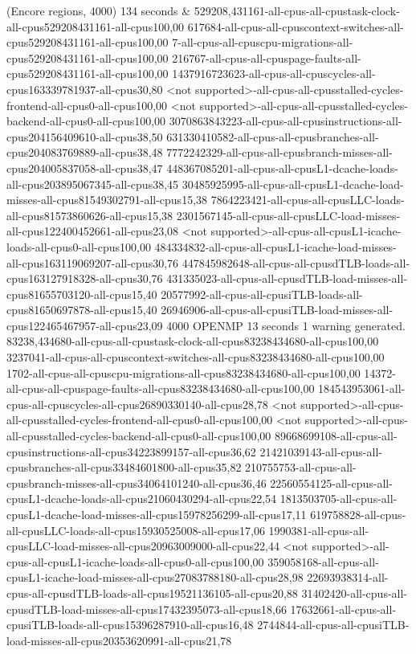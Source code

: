 (Encore regions, 4000) 134 seconds
&
529208,431161-all-cpus-all-cpustask-clock-all-cpus529208431161-all-cpus100,00
617684-all-cpus-all-cpuscontext-switches-all-cpus529208431161-all-cpus100,00
7-all-cpus-all-cpuscpu-migrations-all-cpus529208431161-all-cpus100,00
216767-all-cpus-all-cpuspage-faults-all-cpus529208431161-all-cpus100,00
1437916723623-all-cpus-all-cpuscycles-all-cpus163339781937-all-cpus30,80
<not supported>-all-cpus-all-cpusstalled-cycles-frontend-all-cpus0-all-cpus100,00
<not supported>-all-cpus-all-cpusstalled-cycles-backend-all-cpus0-all-cpus100,00
3070863843223-all-cpus-all-cpusinstructions-all-cpus204156409610-all-cpus38,50
631330410582-all-cpus-all-cpusbranches-all-cpus204083769889-all-cpus38,48
7772242329-all-cpus-all-cpusbranch-misses-all-cpus204005837058-all-cpus38,47
448367085201-all-cpus-all-cpusL1-dcache-loads-all-cpus203895067345-all-cpus38,45
30485925995-all-cpus-all-cpusL1-dcache-load-misses-all-cpus81549302791-all-cpus15,38
7864223421-all-cpus-all-cpusLLC-loads-all-cpus81573860626-all-cpus15,38
2301567145-all-cpus-all-cpusLLC-load-misses-all-cpus122400452661-all-cpus23,08
<not supported>-all-cpus-all-cpusL1-icache-loads-all-cpus0-all-cpus100,00
484334832-all-cpus-all-cpusL1-icache-load-misses-all-cpus163119069207-all-cpus30,76
447845982648-all-cpus-all-cpusdTLB-loads-all-cpus163127918328-all-cpus30,76
431335023-all-cpus-all-cpusdTLB-load-misses-all-cpus81655703120-all-cpus15,40
20577992-all-cpus-all-cpusiTLB-loads-all-cpus81650697878-all-cpus15,40
26946906-all-cpus-all-cpusiTLB-load-misses-all-cpus122465467957-all-cpus23,09
4000 OPENMP 13 seconds
1 warning generated.
83238,434680-all-cpus-all-cpustask-clock-all-cpus83238434680-all-cpus100,00
3237041-all-cpus-all-cpuscontext-switches-all-cpus83238434680-all-cpus100,00
1702-all-cpus-all-cpuscpu-migrations-all-cpus83238434680-all-cpus100,00
14372-all-cpus-all-cpuspage-faults-all-cpus83238434680-all-cpus100,00
184543953061-all-cpus-all-cpuscycles-all-cpus26890330140-all-cpus28,78
<not supported>-all-cpus-all-cpusstalled-cycles-frontend-all-cpus0-all-cpus100,00
<not supported>-all-cpus-all-cpusstalled-cycles-backend-all-cpus0-all-cpus100,00
89668699108-all-cpus-all-cpusinstructions-all-cpus34223899157-all-cpus36,62
21421039143-all-cpus-all-cpusbranches-all-cpus33484601800-all-cpus35,82
210755753-all-cpus-all-cpusbranch-misses-all-cpus34064101240-all-cpus36,46
22560554125-all-cpus-all-cpusL1-dcache-loads-all-cpus21060430294-all-cpus22,54
1813503705-all-cpus-all-cpusL1-dcache-load-misses-all-cpus15978256299-all-cpus17,11
619758828-all-cpus-all-cpusLLC-loads-all-cpus15930525008-all-cpus17,06
1990381-all-cpus-all-cpusLLC-load-misses-all-cpus20963009000-all-cpus22,44
<not supported>-all-cpus-all-cpusL1-icache-loads-all-cpus0-all-cpus100,00
359058168-all-cpus-all-cpusL1-icache-load-misses-all-cpus27083788180-all-cpus28,98
22693938314-all-cpus-all-cpusdTLB-loads-all-cpus19521136105-all-cpus20,88
31402420-all-cpus-all-cpusdTLB-load-misses-all-cpus17432395073-all-cpus18,66
17632661-all-cpus-all-cpusiTLB-loads-all-cpus15396287910-all-cpus16,48
2744844-all-cpus-all-cpusiTLB-load-misses-all-cpus20353620991-all-cpus21,78
